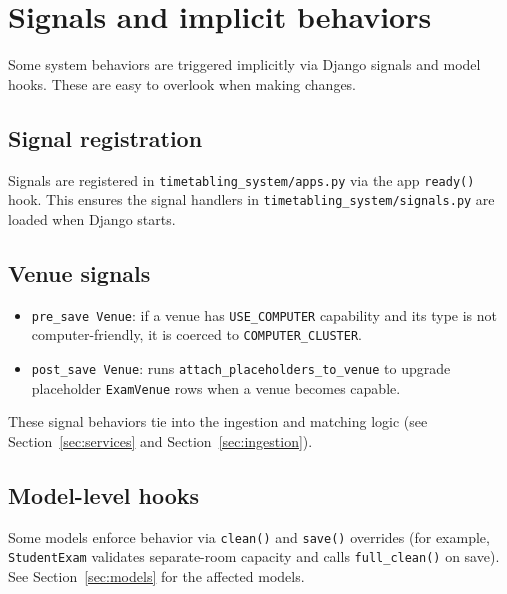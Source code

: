 \section{Signals and implicit behaviors}
\label{sec:signals}

Some system behaviors are triggered implicitly via Django signals and model hooks. These are easy to overlook when making changes.

\subsection{Signal registration}
\label{subsec:signals:registration}

Signals are registered in \texttt{timetabling\_system/apps.py} via the app \texttt{ready()} hook. This ensures the signal handlers in \texttt{timetabling\_system/signals.py} are loaded when Django starts.

\subsection{Venue signals}
\label{subsec:signals:venue}

\begin{itemize}
  \item \texttt{pre\_save Venue}: if a venue has \texttt{USE\_COMPUTER} capability and its type is not computer-friendly, it is coerced to \texttt{COMPUTER\_CLUSTER}.
  \item \texttt{post\_save Venue}: runs \texttt{attach\_placeholders\_to\_venue} to upgrade placeholder \texttt{ExamVenue} rows when a venue becomes capable.
\end{itemize}

These signal behaviors tie into the ingestion and matching logic (see Section~\ref{sec:services} and Section~\ref{sec:ingestion}).

\subsection{Model-level hooks}
\label{subsec:signals:modelhooks}

Some models enforce behavior via \texttt{clean()} and \texttt{save()} overrides (for example, \texttt{StudentExam} validates separate-room capacity and calls \texttt{full\_clean()} on save). See Section~\ref{sec:models} for the affected models.
